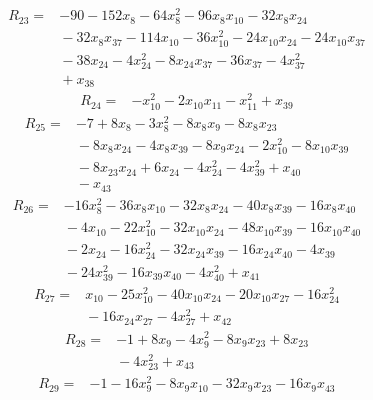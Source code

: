 {%
\begin{align*}
R_{23} ={}& -90 - 152x_{8} - 64x_{8}^{2} - 96x_{8} x_{10} - 32x_{8} x_{24} \\
&{}  - 32x_{8} x_{37} - 114x_{10} - 36x_{10}^{2} - 24x_{10} x_{24} - 24x_{10} x_{37} \\
&{}  - 38x_{24} - 4x_{24}^{2} - 8x_{24} x_{37} - 36x_{37} - 4x_{37}^{2} \\
&{}  + x_{38}
\end{align*}
\begin{align*}
R_{24} ={}& -x_{10}^{2} - 2x_{10} x_{11} - x_{11}^{2} + x_{39}
\end{align*}
\begin{align*}
R_{25} ={}& -7 + 8x_{8} - 3x_{8}^{2} - 8x_{8} x_{9} - 8x_{8} x_{23} \\
&{}  - 8x_{8} x_{24} - 4x_{8} x_{39} - 8x_{9} x_{24} - 2x_{10}^{2} - 8x_{10} x_{39} \\
&{}  - 8x_{23} x_{24} + 6x_{24} - 4x_{24}^{2} - 4x_{39}^{2} + x_{40} \\
&{}  - x_{43}
\end{align*}
\begin{align*}
R_{26} ={}& -16x_{8}^{2} - 36x_{8} x_{10} - 32x_{8} x_{24} - 40x_{8} x_{39} - 16x_{8} x_{40} \\
&{}  - 4x_{10} - 22x_{10}^{2} - 32x_{10} x_{24} - 48x_{10} x_{39} - 16x_{10} x_{40} \\
&{}  - 2x_{24} - 16x_{24}^{2} - 32x_{24} x_{39} - 16x_{24} x_{40} - 4x_{39} \\
&{}  - 24x_{39}^{2} - 16x_{39} x_{40} - 4x_{40}^{2} + x_{41}
\end{align*}
\begin{align*}
R_{27} ={}& x_{10} - 25x_{10}^{2} - 40x_{10} x_{24} - 20x_{10} x_{27} - 16x_{24}^{2} \\
&{}  - 16x_{24} x_{27} - 4x_{27}^{2} + x_{42}
\end{align*}
\begin{align*}
R_{28} ={}& -1 + 8x_{9} - 4x_{9}^{2} - 8x_{9} x_{23} + 8x_{23} \\
&{}  - 4x_{23}^{2} + x_{43}
\end{align*}
\begin{align*}
R_{29} ={}& -1 - 16x_{9}^{2} - 8x_{9} x_{10} - 32x_{9} x_{23} - 16x_{9} x_{43} \\

\end{align*}}
